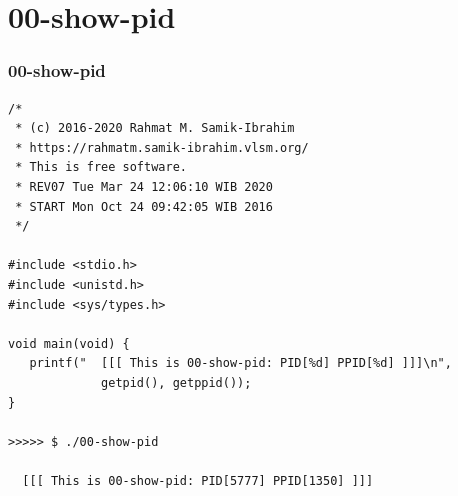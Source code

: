 \documentclass[xcolor=table, notheorems, hyperref={pdfpagelabels=false}]{beamer}
\begin{document}
\section{00-show-pid}
\begin{frame}[fragile]
\frametitle{00-show-pid}
\begin{lstlisting}[basicstyle=\ttfamily\footnotesize]
/*
 * (c) 2016-2020 Rahmat M. Samik-Ibrahim
 * https://rahmatm.samik-ibrahim.vlsm.org/
 * This is free software.
 * REV07 Tue Mar 24 12:06:10 WIB 2020
 * START Mon Oct 24 09:42:05 WIB 2016
 */

#include <stdio.h>
#include <unistd.h>
#include <sys/types.h>

void main(void) {
   printf("  [[[ This is 00-show-pid: PID[%d] PPID[%d] ]]]\n",
             getpid(), getppid());
}

>>>>> $ ./00-show-pid

  [[[ This is 00-show-pid: PID[5777] PPID[1350] ]]]

\end{lstlisting}
\end{frame}

\end{document}
